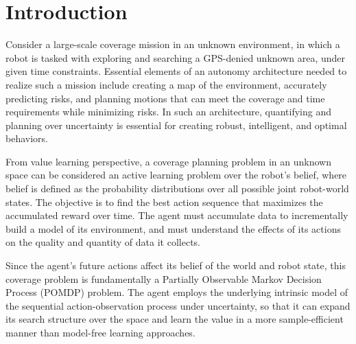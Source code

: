 \documentclass{article}
\newcommand{\ph}[1]{{\textbf{#1}:}} %
\begin{document}




\section{Introduction}

Consider a large-scale coverage mission in an unknown environment, in which a robot is tasked with exploring and searching a GPS-denied unknown area, under given time constraints. Essential elements of an autonomy architecture needed to realize such a mission include creating a map of the environment, accurately predicting risks, and planning motions that can meet the coverage and time requirements while minimizing risks.  In such an architecture, quantifying and planning over uncertainty is essential for creating robust, intelligent, and optimal behaviors.

From value learning perspective, a coverage planning problem in an unknown space can be considered an active learning problem over the robot's belief, where belief is defined as the probability distributions over all possible joint robot-world states.
%
The objective is to find the best action sequence that maximizes the accumulated reward over time.  The agent must accumulate data to incrementally build a model of its environment, and must understand the effects of its actions on the quality and quantity of data it collects.

Since the agent's future actions affect its belief of the world and robot state, this coverage problem is fundamentally a Partially Observable Markov Decision Process (POMDP) problem.
The agent employs the underlying intrinsic model of the sequential action-observation process under uncertainty, so that it can %
expand its search structure over the space and learn the value in a more sample-efficient manner than model-free learning approaches.
\end{document}
